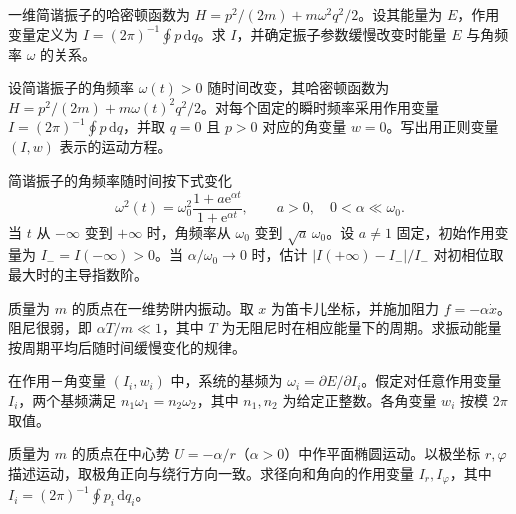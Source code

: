 \newpage
\noindent\begin{minipage}{\textwidth}
一维简谐振子的哈密顿函数为 $H=p^2/(2m)+m\omega^2q^2/2$。设其能量为 $E$，作用变量定义为 $I=(2\pi)^{-1}\oint p\,\mathrm dq$。求 $I$，并确定振子参数缓慢改变时能量 $E$ 与角频率 $\omega$ 的关系。
\end{minipage}\par\vfill
\noindent\begin{minipage}{\textwidth}
设简谐振子的角频率 $\omega(t)>0$ 随时间改变，其哈密顿函数为 $H=p^2/(2m)+m\omega(t)^2q^2/2$。对每个固定的瞬时频率采用作用变量 $I=(2\pi)^{-1}\oint p\,\mathrm dq$，并取 $q=0$ 且 $p>0$ 对应的角变量 $w=0$。写出用正则变量 $(I,w)$ 表示的运动方程。
\end{minipage}\par\vfill
\newpage
\noindent\begin{minipage}{\textwidth}
简谐振子的角频率随时间按下式变化
\[
\omega^2(t)=\omega_0^2\frac{1+a\mathrm e^{\alpha t}}{1+\mathrm e^{\alpha t}},
\qquad a>0,\quad 0<\alpha\ll\omega_0 .
\]
当 $t$ 从 $-\infty$ 变到 $+\infty$ 时，角频率从 $\omega_0$ 变到 $\sqrt a\,\omega_0$。设 $a\ne1$ 固定，初始作用变量为 $I_-=I(-\infty)>0$。当 $\alpha/\omega_0\to0$ 时，估计 $|I(+\infty)-I_-|/I_-$ 对初相位取最大时的主导指数阶。
\end{minipage}\par\vfill
\noindent\begin{minipage}{\textwidth}
质量为 $m$ 的质点在一维势阱内振动。取 $x$ 为笛卡儿坐标，并施加阻力 $f=-\alpha\dot x$。阻尼很弱，即 $\alpha T/m\ll1$，其中 $T$ 为无阻尼时在相应能量下的周期。求振动能量按周期平均后随时间缓慢变化的规律。
\end{minipage}\par\vfill
\newpage
\noindent\begin{minipage}{\textwidth}
在作用－角变量 $(I_i,w_i)$ 中，系统的基频为 $\omega_i=\partial E/\partial I_i$。假定对任意作用变量 $I_i$，两个基频满足 $n_1\omega_1=n_2\omega_2$，其中 $n_1,n_2$ 为给定正整数。各角变量 $w_i$ 按模 $2\pi$ 取值。
\end{minipage}\par\vfill
\noindent\begin{minipage}{\textwidth}
质量为 $m$ 的质点在中心势 $U=-\alpha/r$（$\alpha>0$）中作平面椭圆运动。以极坐标 $r,\varphi$ 描述运动，取极角正向与绕行方向一致。求径向和角向的作用变量 $I_r,I_\varphi$，其中 $I_i=(2\pi)^{-1}\oint p_i\,\mathrm dq_i$。
\end{minipage}\par\vfill
